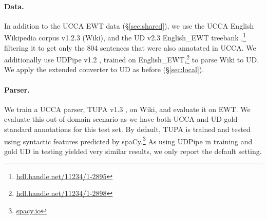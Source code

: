 \documentclass[11pt,a4paper]{article}
\begin{document}
\paragraph{Data.}

In addition to the UCCA EWT data (\S\ref{sec:shared}),
we use the UCCA English Wikipedia corpus v1.2.3 (Wiki),
and the UD v2.3 English\_EWT treebank
\cite{11234/1-2895},\footnote{\url{hdl.handle.net/11234/1-2895}}
filtering it to get only the 804 sentences that were also annotated in UCCA.
We additionally use UDPipe v1.2 \cite{udpipe,udpipe:2017},
trained on
English\_EWT,\footnote{\url{hdl.handle.net/11234/1-2898}}
to parse Wiki to UD.
We apply the extended converter to UD as before (\S\ref{sec:local}).

\paragraph{Parser.}

We train a UCCA parser,
TUPA v1.3 \cite{hershcovich2017a,hershcovich2018multitask},
on Wiki, and evaluate it on EWT.
We evaluate this out-of-domain scenario as
we have both UCCA and UD gold-standard annotations for this test set.
By default, TUPA is trained and tested using syntactic features
predicted by spaCy.\footnote{\url{spacy.io}}
As using UDPipe in training and gold UD in testing yielded very similar
results, we only report the default setting.

%
\end{document}
